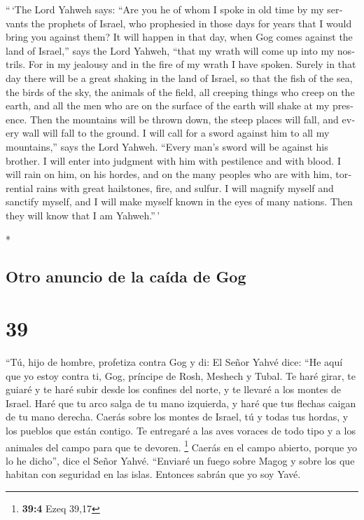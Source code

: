\begin{paracol}{2}
\begin{otherlanguage}{english}
 ``\,`The Lord Yahweh says: ``Are you he of whom I spoke
in old time by my servants the prophets of Israel, who prophesied in
those days for years that I would bring you against them?
 It will happen in that day, when Gog comes against the
land of Israel,'' says the Lord Yahweh, ``that my wrath will come up
into my nostrils.  For in my jealousy and in the fire of
my wrath I have spoken. Surely in that day there will be a great shaking
in the land of Israel,  so that the fish of the sea, the
birds of the sky, the animals of the field, all creeping things who
creep on the earth, and all the men who are on the surface of the earth
will shake at my presence. Then the mountains will be thrown down, the
steep places will fall, and every wall will fall to the ground.
 I will call for a sword against him to all my
mountains,'' says the Lord Yahweh. ``Every man's sword will be against
his brother.  I will enter into judgment with him with
pestilence and with blood. I will rain on him, on his hordes, and on the
many peoples who are with him, torrential rains with great hailstones,
fire, and sulfur.  I will magnify myself and sanctify
myself, and I will make myself known in the eyes of many nations. Then
they will know that I am Yahweh.''\,'

\end{otherlanguage}

\switchcolumn[0]*

\hypertarget{otro-anuncio-de-la-cauxedda-de-gog}{%
\subsection{Otro anuncio de la caída de
Gog}\label{otro-anuncio-de-la-cauxedda-de-gog}}

\hypertarget{section-76}{%
\section{39}\label{section-76}}

 ``Tú, hijo de hombre, profetiza contra Gog y di: El Señor
Yahvé dice: ``He aquí que yo estoy contra ti, Gog, príncipe de Rosh,
Meshech y Tubal.  Te haré girar, te guiaré y te haré subir
desde los confines del norte, y te llevaré a los montes de Israel.
 Haré que tu arco salga de tu mano izquierda, y haré que
tus flechas caigan de tu mano derecha.  Caerás sobre los
montes de Israel, tú y todas tus hordas, y los pueblos que están
contigo. Te entregaré a las aves voraces de todo tipo y a los animales
del campo para que te devoren. \footnote{\textbf{39:4} Ezeq 39,17}
 Caerás en el campo abierto, porque yo lo he dicho'', dice
el Señor Yahvé.  ``Enviaré un fuego sobre Magog y sobre
los que habitan con seguridad en las islas. Entonces sabrán que yo soy
Yavé.


\end{paracol}
